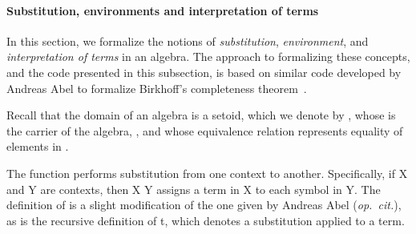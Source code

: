 \paragraph*{Substitution, environments and interpretation of terms}
In this section, we formalize the notions of \emph{substitution}, \emph{environment}, and
\emph{interpretation of terms} in an algebra. The approach to formalizing these concepts,
and the \agda code presented in this subsection, is based on similar code developed by
Andreas Abel to formalize Birkhoff's completeness theorem~\cite{Abel:2021}.

\ifshort\else
Recall that the domain of an algebra  is a setoid, which we denote by
, whose  is the carrier of the algebra, ,
and whose equivalence relation represents equality of elements in .
\fi

The function  performs substitution from one context to
another.  Specifically, if \ab X and \ab Y are contexts, then  \ab X \ab Y
assigns a term in \ab X to each symbol in \ab Y.
The definition of  is a slight modification of the one given by Andreas Abel
(\textit{op.~cit.}), as is the recursive definition of \af{[~\ab{σ}~]} \ab t,
which denotes a substitution applied to a term.

